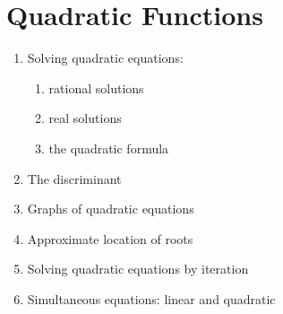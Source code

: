 
\chapter{Quadratic Functions}

\begin{enumerate}
\item Solving quadratic equations:
  \begin{enumerate}
  \item rational solutions

  \item real solutions

  \item the quadratic formula
  \end{enumerate}

\item The discriminant

\item Graphs of quadratic equations

\item Approximate location of roots

\item Solving quadratic equations by iteration

\item Simultaneous equations: linear and quadratic
\end{enumerate}
